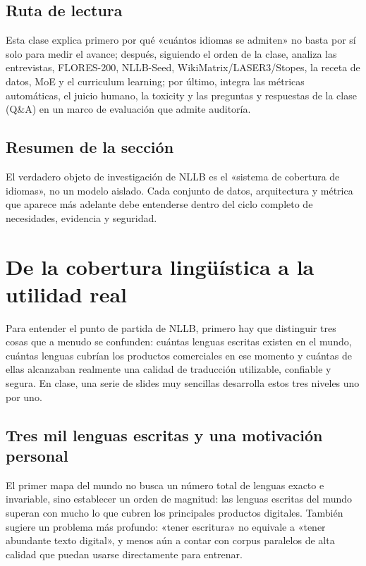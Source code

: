 \documentclass[a4paper]{article}
\begin{document}
\subsection{Ruta de lectura}

Esta clase explica primero por qué «cuántos idiomas se admiten» no basta por sí solo para medir el avance; después, siguiendo el orden de la clase, analiza las entrevistas, FLORES-200, NLLB-Seed, WikiMatrix/LASER3/Stopes, la receta de datos, MoE y el curriculum learning; por último, integra las métricas automáticas, el juicio humano, la toxicity y las preguntas y respuestas de la clase (Q\&A) en un marco de evaluación que admite auditoría.

\subsection{Resumen de la sección}

El verdadero objeto de investigación de NLLB es el «sistema de cobertura de idiomas», no un modelo aislado. Cada conjunto de datos, arquitectura y métrica que aparece más adelante debe entenderse dentro del ciclo completo de necesidades, evidencia y seguridad.
\section{De la cobertura lingüística a la utilidad real}

Para entender el punto de partida de NLLB, primero hay que distinguir tres cosas que a menudo se confunden: cuántas lenguas escritas existen en el mundo, cuántas lenguas cubrían los productos comerciales en ese momento y cuántas de ellas alcanzaban realmente una calidad de traducción utilizable, confiable y segura. En clase, una serie de slides muy sencillas desarrolla estos tres niveles uno por uno.

\subsection{Tres mil lenguas escritas y una motivación personal}

El primer mapa del mundo no busca un número total de lenguas exacto e invariable, sino establecer un orden de magnitud: las lenguas escritas del mundo superan con mucho lo que cubren los principales productos digitales. También sugiere un problema más profundo: «tener escritura» no equivale a «tener abundante texto digital», y menos aún a contar con corpus paralelos de alta calidad que puedan usarse directamente para entrenar.
\end{document}
